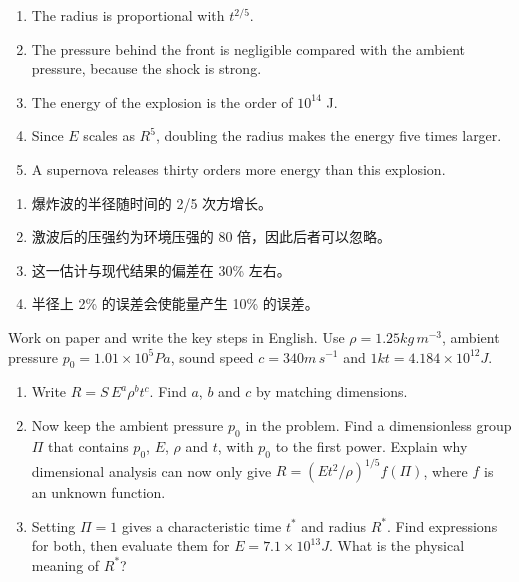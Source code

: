 \documentclass[11pt,a4paper]{article}
\begin{document}
\begin{enumerate}[label=\textbf{\arabic*.}]
  \item The radius is proportional with $t^{2/5}$.
  \item The pressure behind the front is negligible compared with the ambient pressure, because the shock is strong.
  \item The energy of the explosion is the order of $10^{14}$ J.
  \item Since $E$ scales as $R^5$, doubling the radius makes the energy five times larger.
  \item A supernova releases thirty orders more energy than this explosion.
\end{enumerate}

\begin{enumerate}[label=\textbf{\arabic*.}]
  \item 爆炸波的半径随时间的 2/5 次方增长。
  \item 激波后的压强约为环境压强的 80 倍，因此后者可以忽略。
  \item 这一估计与现代结果的偏差在 30\% 左右。
  \item 半径上 2\% 的误差会使能量产生 10\% 的误差。
\end{enumerate}


Work on paper and write the key steps in English. Use $\rho=1.25\unit{kg\,m^{-3}}$, ambient pressure $p_0=1.01\times10^5\unit{Pa}$, sound speed $c=340\unit{m\,s^{-1}}$ and $1\unit{kt}=4.184\times10^{12}\unit{J}$.

\begin{enumerate}[label=(\alph*)]
  \item Write $R=S\,E^{a}\rho^{b}t^{c}$. Find $a$, $b$ and $c$ by matching dimensions.
  \item Now keep the ambient pressure $p_0$ in the problem. Find a dimensionless group $\Pi$ that contains $p_0$, $E$, $\rho$ and $t$, with $p_0$ to the first power. Explain why dimensional analysis can now only give $R=(Et^2/\rho)^{1/5}f(\Pi)$, where $f$ is an unknown function.
  \item Setting $\Pi=1$ gives a characteristic time $t^*$ and radius $R^*$. Find expressions for both, then evaluate them for $E=7.1\times10^{13}\unit{J}$. What is the physical meaning of $R^*$?
\end{enumerate}
\end{document}
